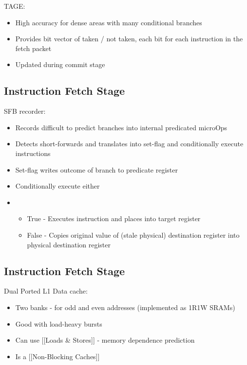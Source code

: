 \documentclass[a4paper, 5pt, twocolumn]{article}
\begin{document}
TAGE:
\begin{itemize}[topsep=0pt,itemsep=-1ex,partopsep=1ex,parsep=1ex]
	\item High accuracy for dense areas with many conditional branches
	\item Provides bit vector of taken / not taken, each bit for each instruction in the fetch packet
	\item Updated during commit stage \\
\end{itemize}

\hypertarget{Execute Stage}{%
\subsection{Instruction Fetch Stage}\label{executestage}}

SFB recorder:

\begin{itemize}[topsep=0pt,itemsep=-1ex,partopsep=1ex,parsep=1ex]
	\item Records difficult to predict branches into internal predicated microOps
	\item Detects short-forwards and translates into set-flag and conditionally execute instructions
	\item Set-flag writes outcome of branch to predicate register
	\item Conditionally execute either
	\item \begin{itemize}[topsep=0pt,itemsep=-1ex,partopsep=1ex,parsep=1ex]
		\item True - Executes instruction and places into target register
		\item False - Copies original value of (stale physical) destination register into physical destination register \\
	\end{itemize}
\end{itemize}

\hypertarget{loadstorestage}{%
\subsection{Instruction Fetch Stage}\label{loadstorestage}}

Dual Ported L1 Data cache:

\begin{itemize}[topsep=0pt,itemsep=-1ex,partopsep=1ex,parsep=1ex]
	\item Two banks - for odd and even addresses (implemented as 1R1W SRAMs)
	\item Good with load-heavy bursts
	\item Can use [[Loads \& Stores]] - memory dependence prediction
	\item Is a [[Non-Blocking Caches]] \\
\end{itemize}
\end{document}
